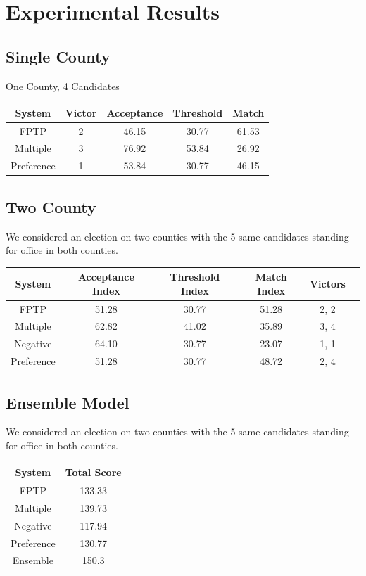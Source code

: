 \documentclass[a4paper]{article}
\begin{document}
\section{Experimental Results}
\subsection{ Single County }
One County, 4 Candidates
\begin{center}
\begin{tabular}{ | c | c | c | c |c|  }
\hline
System & Victor &	Acceptance &	Threshold &	Match \\
	\hline
FPTP & 2 &	46.15 & 30.77 &	61.53 \\
\hline
Multiple & 3 &	76.92  &	53.84 &	26.92 \\
\hline
Preference & 1 &	53.84 & 30.77 &	46.15  \\
\hline

\end{tabular}
\end{center}

\subsection{ Two County }
We considered an election on two counties with the 5 same candidates standing for office in both counties.
\begin{center}
\begin{tabular}{ | c | c | c |c |c |c|  }
\hline
System &	Acceptance Index &	Threshold Index &	Match Index	& Victors	
 \\
\hline
FPTP &	51.28 &	30.77 &	51.28 &	2, 2  \\
\hline 
Multiple &	62.82 &	41.02 &	35.89 &	3, 4  \\
\hline
Negative &	64.10 &	30.77 &	23.07 &	1, 1 \\
\hline
Preference &	51.28 &	30.77 &	48.72 &	2, 4  \\
\hline

\end{tabular}
\end{center}

\subsection{ Ensemble Model }
We considered an election on two counties with the 5 same candidates standing for office in both counties.
\begin{center}
\begin{tabular}{ | c | c | c |c |c |c|  }
\hline
System & Total Score \\
\hline
FPTP &		133.33 \\
\hline 
Multiple &		139.73 \\
\hline
Negative &		117.94 \\
\hline
Preference &	130.77 \\
\hline
Ensemble & 150.3 \\
\hline

\end{tabular}
\end{center}
\end{document}
